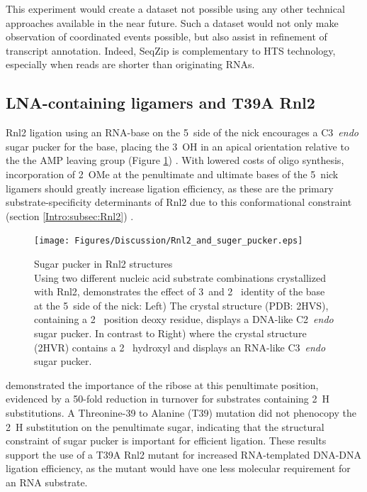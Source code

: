     This experiment would create a dataset not possible using any other technical approaches available in the near future. Such a dataset would not only make observation of coordinated events possible, but also assist in refinement of transcript annotation. Indeed, SeqZip is complementary to HTS technology, especially when reads are shorter than originating RNAs.

  \subsection{LNA-containing ligamers and T39A Rnl2}
    \label{Disc:subsec:LNA-Containing ligamers and T39A Rnk2}

    Rnl2 ligation using an RNA-base on the 5\textprime~side of the nick encourages a C3\textprime~\textit{endo} sugar pucker for the base, placing the 3\textprime~OH in an apical orientation relative to the the AMP leaving group (Figure \ref{Disc:fig:Rnl2 and suger pucker}) \citep{Nandakumar2006}. With lowered costs of oligo synthesis, incorporation of 2\textprime~OMe at the penultimate and ultimate bases of the 5\textprime~nick ligamers should greatly increase ligation efficiency, as these are the primary substrate-specificity determinants of Rnl2 due to this conformational constraint (section \ref{Intro:subsec:Rnl2}) \citep{Nandakumar2004a, Nandakumar2006}.

    \begin{figure} %
      \centering 
      \texttt{[image: Figures/Discussion/Rnl2\_and\_suger\_pucker.eps]}
      \caption[Sugar pucker in Rnl2 structures]
      {Sugar pucker in Rnl2 structures \\[0.25cm]
        Using two different nucleic acid substrate combinations crystallized with Rnl2, \citet{Nandakumar2006} demonstrates the effect of 3\textprime~and 2\textprime~ identity of the base at the 5\textprime~side of the nick: Left) The crystal structure (PDB: 2HVS), containing a 2\textprime~ position deoxy residue, displays a DNA-like C2\textprime~\textit{endo} sugar pucker. In contrast to Right) where the crystal structure (2HVR) contains a 2\textprime~ hydroxyl and displays an RNA-like C3\textprime~\textit{endo} sugar pucker.
        }
        \label{Disc:fig:Rnl2 and suger pucker}
        \end{figure}

    \citet{Nandakumar2004a} demonstrated the importance of the ribose at this penultimate position, evidenced by a 50-fold reduction in turnover for substrates containing 2\textprime~H substitutions. A Threonine-39 to Alanine (T39) mutation did not phenocopy the 2\textprime~H substitution on the penultimate sugar, indicating that the structural constraint of sugar pucker is important for efficient ligation. These results support the use of a T39A Rnl2 mutant for increased RNA-templated DNA-DNA ligation efficiency, as the mutant would have one less molecular requirement for an RNA substrate.

